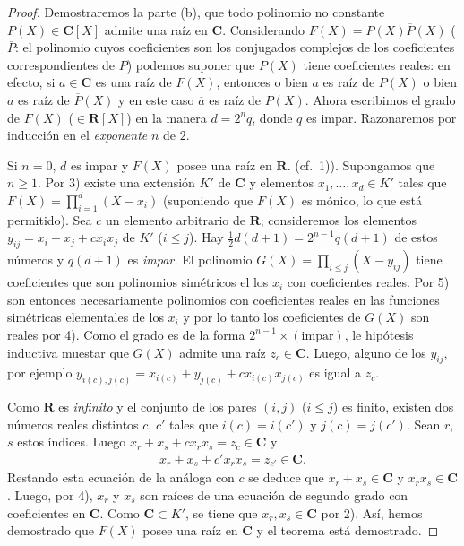 \documentclass[oneside,bibtotoc,leqno,spanish]{amsbook}
\newcommand{\RR}{\mathbf{R}}
\newcommand{\CC}{\mathbf{C}}
\newcommand{\oline}[1]{\overline{#1}}
\numberwithin{equation}{section}
\theoremstyle{defi}
\theoremstyle{note}
\theoremstyle{rem}
\numberwithin{theorem}{section}
\numberwithin{proposition}{section}
\numberwithin{definition}{section}
\numberwithin{lemma}{section}
\numberwithin{corollary}{section}
\numberwithin{example}{section}
\numberwithin{footnote}{section}%
\begin{document}
\begin{proof}
Demostraremos la parte (b), que todo polinomio no constante $P(X)\in\CC[X]$ admite una ra\'iz en
$\CC$. Considerando $F(X) = P(X)\oline P(X)$ ($\oline P$: el polinomio cuyos coeficientes son los
conjugados complejos de los coeficientes correspondientes de $P$) podemos suponer que $P(X)$ tiene
coeficientes reales: en efecto, si $a\in\CC$ es una ra\'iz de $F(X)$, entonces o bien $a$ es ra\'iz
de $P(X)$ o bien $a$ es ra\'iz de $\oline P(X)$ y en este caso $\oline a$ es ra\'iz de $P(X)$.
Ahora escribimos el grado de $F(X)$ ($\in\RR[X]$) en la manera $d = 2^{n}q$, donde $q$ es impar.
Razonaremos por inducci\'on en el {\em exponente} $n$ de $2$.

Si $n = 0$, $d$ es impar y
$F(X)$ posee una ra\'iz en $\RR$. (cf.~1)). Supongamos que $n \geq 1$. Por 3) existe una extensi\'on
$K'$ de $\CC$ y elementos $x_{1},\dots,x_{d}\in K'$ tales que $F(X) = \prod_{i=1}^{d}(X-x_{i})$
(suponiendo que $F(X)$ es m\'onico, lo que est\'a permitido). Sea $c$ un elemento arbitrario de $\RR$;
consideremos los elementos $y_{ij} = x_{i}+x_{j}+cx_{i}x_{j}$ de $K'$ ($i\leq j$). Hay
$\frac{1}{2}d(d+1) = 2^{n-1}q(d+1)$ de estos n\'umeros y $q(d+1)$ es {\em impar.} El polinomio
$G(X) = \prod_{i\leq j}(X-y_{ij})$ tiene coeficientes que son polinomios sim\'etricos el los $x_{i}$
con coeficientes reales. Por 5) son entonces necesariamente polinomios con coeficientes reales
en las funciones sim\'etricas elementales de los $x_{i}$ y por lo tanto los coeficientes de $G(X)$
son reales por 4). Como el grado es de la forma $2^{n-1}\times(\text{impar})$, le hip\'otesis
inductiva muestar que $G(X)$ admite una ra\'iz $z_{c}\in\CC$. Luego, alguno de los $y_{ij}$,
por ejemplo $y_{i(c),j(c)} = x_{i(c)}+y_{j(c)}+cx_{i(c)}x_{j(c)}$ es igual a $z_{c}$.

Como $\RR$ es {\em infinito} y el conjunto de los pares $(i,j)$ ($i\leq j$) es finito, existen
dos n\'umeros reales distintos $c$, $c'$ tales que $i(c) = i(c')$ y $j(c) = j(c')$. Sean $r$, $s$
estos \'indices. Luego $x_{r}+x_{s}+cx_{r}x_{s} = z_{c}\in\CC$ y
\begin{gather*}
x_{r}+x_{s}+c'x_{r}x_{s}=z_{c'}\in\CC.
\end{gather*}
Restando esta ecuaci\'on de la an\'aloga con $c$ se deduce que $x_{r}+x_{s}\in\CC$ y $x_{r}x_{s}\in\CC$.
Luego, por 4), $x_{r}$ y $x_{s}$ son ra\'ices de una ecuaci\'on de segundo grado con coeficientes
en $\CC$. Como $\CC\subset K'$, se tiene que $x_{r},x_{s}\in\CC$ por 2). As\'i, hemos demostrado que
$F(X)$ posee una ra\'iz en $\CC$ y el teorema est\'a demostrado.
\end{proof}
\end{document}
